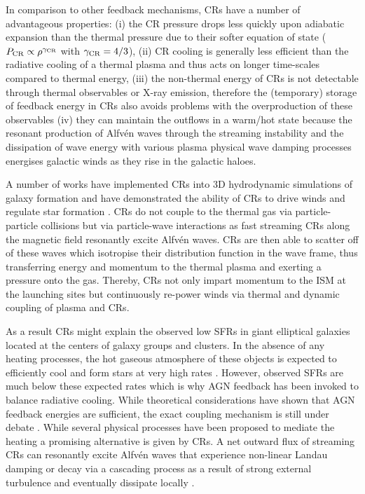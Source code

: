 \documentclass[useAMS,usenatbib]{mnras}
\newcommand{\Msun}{{\ifmmode{{\rm M}_{\odot}}\else{${\rm M}_{\odot}$}\fi}}
\def \Msun {\ifmmode {\rm M}_{\odot} \else ${\rm M}_{\odot}$ \fi}
\begin{document}
In comparison to other feedback mechanisms, CRs have a number of advantageous properties: 
(i) the CR pressure drops less quickly upon adiabatic expansion than the thermal pressure due to their softer equation of state ($P_{\rm CR} \propto \rho^{\gamma_{\rm CR}}$ with $\gamma_{\rm CR} = 4/3$),
(ii) CR cooling is generally less efficient than the radiative cooling of a thermal plasma \citep{Ensslin2007} and thus acts on longer time-scales compared to thermal energy,
(iii) the non-thermal energy of CRs is not detectable through thermal observables or X-ray emission, therefore the (temporary) storage of feedback energy in CRs also avoids problems with the overproduction of these observables
(iv) they can maintain the outflows in a warm/hot state because the resonant production of Alfv\'en waves through the streaming instability \citep{Kulsrud1969} and the dissipation of wave energy with various plasma physical wave damping processes energises galactic winds as they rise in the galactic haloes.

A number of works have implemented CRs into 3D hydrodynamic simulations of galaxy formation and have demonstrated the ability of CRs to drive winds and regulate star formation  \citep{Jubelgas2008,Uhlig2012,Booth2013,Salem2014,Pakmor2016,Ruszkowski2017,Pfrommer2017b,Jacob2018,Chan2019}. CRs do not couple to the thermal gas via particle-particle collisions but via particle-wave interactions as fast streaming CRs along the magnetic field resonantly excite Alfv\'en waves. CRs are then able to scatter off of these waves which isotropise their distribution function in the wave frame, thus transferring energy and momentum to the thermal plasma and exerting a pressure onto the gas. Thereby, CRs not only impart momentum to the ISM at the launching sites but continuously re-power winds via thermal and dynamic coupling of plasma and CRs.
   
As a result CRs might explain the observed low SFRs in giant elliptical galaxies located at the centers of galaxy groups and clusters. In the absence of any heating processes, the hot gaseous atmosphere of these objects is expected to efficiently cool and form stars at very high rates \citep[up to a few hundred \Msun yr$^{-1}$, e.g.][]{Peterson2006}. However, observed SFRs are much below these expected rates which is why AGN feedback has been invoked to balance radiative cooling. While theoretical considerations have shown that AGN feedback energies are sufficient, the exact coupling mechanism is still under debate \citep{McNamara2007}. While several physical processes have been proposed to mediate the heating \citep[amongst others the dissipation of turbulent energy powered by the AGN,][]{Zhuravleva2014} a promising alternative is given by CRs. A net outward flux of streaming CRs can resonantly excite Alfv\'en waves that experience non-linear Landau damping or decay via a cascading process as a result of strong external turbulence and eventually dissipate locally \citep{Loewenstein1991,Guo2008,Ensslin2011,Pfrommer2013,Wiener2013,Jacob2017,Jacob2017b,Ruszkowski2017b,Ehlert2018}.
\end{document}
